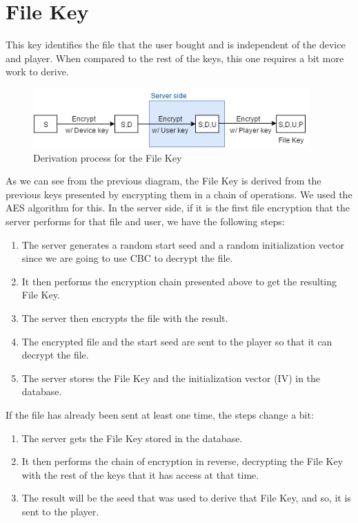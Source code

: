 \documentclass[11pt,a4paper]{report}
\begin{document}
\section{File Key}
This key identifies the file that the user bought and is independent of the device and player. When compared to the rest of the keys, this one requires a bit more work to derive.

\begin{figure}[H]
\centerline{\includegraphics[width=300pt]{images/fileKey.png}}
\caption{Derivation process for the File Key}
\label{fileKey}
\end{figure}

As we can see from the previous diagram, the File Key is derived from the previous keys presented by encrypting them in a chain of operations.
We used the AES algorithm for this.
\newline In the server side, if it is the first file encryption that the server performs for that file and user, we have the following steps:
\begin{enumerate}
  \item The server generates a random start seed and a random initialization vector since we are going to use CBC to decrypt the file.
  \item It then performs the encryption chain presented above to get the resulting File Key.
  \item The server then encrypts the file with the result.
  \item The encrypted file and the start seed are sent to the player so that it can decrypt the file.
  \item The server stores the File Key and the initialization vector (IV) in the database.
\end{enumerate}

If the file has already been sent at least one time, the steps change a bit:
\begin{enumerate}
  \item The server gets the File Key stored in the database.
  \item It then performs the chain of encryption in reverse, decrypting the File Key with the rest of the keys that it has access at that time.
  \item The result will be the seed that was used to derive that File Key, and so, it is sent to the player.
\end{enumerate}
\end{document}
